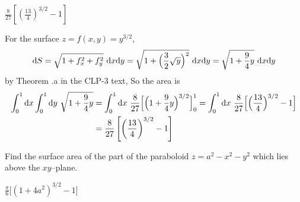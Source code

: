 \begin{answer} 
$\frac{8}{27}\left[\left(\frac{13}{4}\right)^{3/2}-1\right]$
\end{answer}


\begin{solution}
For the surface $z=f(x,y)=y^{3/2}$,
\begin{equation*}
\dee{S}=\sqrt{1+f_x^2+f_y^2}\ \dee{x}\dee{y}
=\sqrt{1+\Big(\frac{3}{2}\sqrt{y}\Big)^2}\ \dee{x}\dee{y}
=\sqrt{1+\frac{9}{4}y}\ \dee{x}\dee{y}
\end{equation*}
by Theorem .a in the CLP-3 text,
So the area is
\begin{align*}
\int_0^1\dee{x}\int_0^1\dee{y}\ \sqrt{1+\frac{9}{4}y}
&=\int_0^1\dee{x}\ \frac{8}{27}\Big[\Big(1+\frac{9}{4}y\Big)^{3/2}\Big]_0^1
=\int_0^1\dee{x}\ \frac{8}{27}\Big[\Big(\frac{13}{4}\Big)^{3/2}-1\Big] \\
&=\frac{8}{27}\left[\left(\frac{13}{4}\right)^{3/2}-1\right]
\end{align*}
\end{solution}


\begin{question}[M253 2013D] %
Find the surface area of the part of the paraboloid 
$z = a^2 - x^2 - y^2$ which lies above the $xy$--plane.
\end{question}


\begin{answer}
$\frac{\pi}{6}\big[{(1+4a^2)}^{3/2}-1\big]$
\end{answer}


